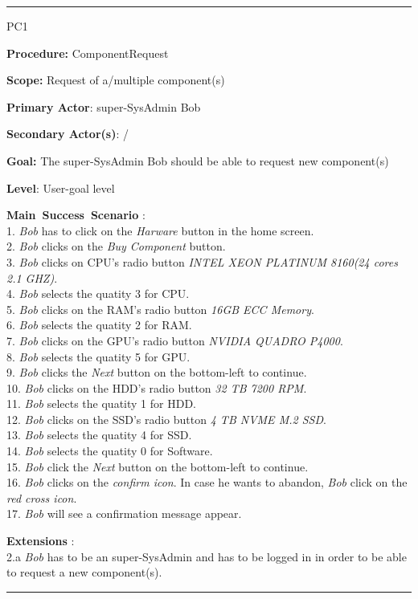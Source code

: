 \hrule
\vspace{0.5cm}
\begin{lyxlist}{PC1}
\small{
\item [\textbf{Procedure:}] ComponentRequest
\item [\textbf{Scope:}] Request of a/multiple component(s)
\item [\textbf{Primary Actor}:] super-SysAdmin Bob
\item [\textbf{Secondary Actor(s)}:] /
\item [\textbf{Goal:}] The super-SysAdmin Bob should be able to request new
component(s)
\item [\textbf{Level}:] User-goal level
\item [\textbf{Main~Success~Scenario}]:\\
1. \emph{Bob} has to click on the \emph{Harware} button in the home screen.\\
2. \emph{Bob} clicks on the \emph{Buy Component} button.\\
3. \emph{Bob} clicks on CPU's radio button \emph{INTEL XEON PLATINUM 8160(24
cores 2.1 GHZ)}.\\
4. \emph{Bob} selects the quatity 3 for CPU.\\
5. \emph{Bob} clicks on the RAM's radio button \emph{16GB ECC Memory}.\\
6. \emph{Bob} selects the quatity 2 for RAM.\\
7. \emph{Bob} clicks on the GPU's radio button \emph{NVIDIA QUADRO P4000}.\\
8. \emph{Bob} selects the quatity 5 for GPU.\\
9. \emph{Bob} clicks the \emph{Next} button on the bottom-left to continue.\\
10. \emph{Bob} clicks on the HDD's radio button \emph{32 TB 7200 RPM}.\\
11. \emph{Bob} selects the quatity 1 for HDD.\\
12. \emph{Bob} clicks on the SSD's radio button \emph{4 TB NVME M.2 SSD}.\\
13. \emph{Bob} selects the quatity 4 for SSD.\\
14. \emph{Bob} selects the quatity 0 for Software.\\
15. \emph{Bob} click the \emph{Next} button on the bottom-left to continue.\\
16. \emph{Bob} clicks on the \emph{confirm icon}. In case he wants to abandon,
\emph{Bob} click on the \emph{red cross icon}.\\
17. \emph{Bob} will see a confirmation message appear.


\item [\textbf{Extensions}]:\\
2.a \emph{Bob} has to be an super-SysAdmin and has to be logged in in order to
be able to request a new component(s).\\
}
\end{lyxlist}
\hrule







